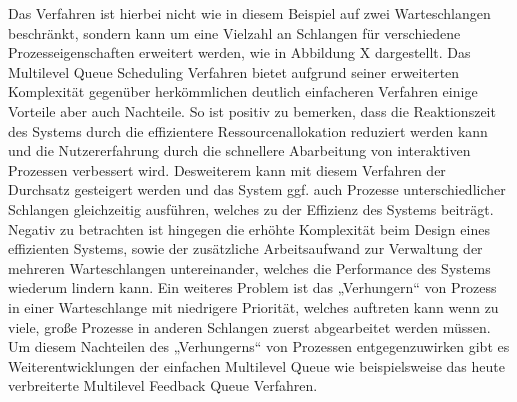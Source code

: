 Das Verfahren ist hierbei nicht wie in diesem Beispiel auf zwei Warteschlangen beschränkt, sondern kann um eine Vielzahl an Schlangen für verschiedene Prozesseigenschaften erweitert werden, wie in Abbildung X dargestellt.
Das Multilevel Queue Scheduling Verfahren bietet aufgrund seiner erweiterten Komplexität gegenüber herkömmlichen deutlich einfacheren Verfahren einige Vorteile aber auch Nachteile. So ist positiv zu bemerken, dass die Reaktionszeit des Systems durch die effizientere Ressourcenallokation reduziert werden kann und die Nutzererfahrung durch die schnellere Abarbeitung von interaktiven Prozessen verbessert wird. Desweiterem kann mit diesem Verfahren der Durchsatz gesteigert werden und das System ggf. auch Prozesse unterschiedlicher Schlangen gleichzeitig ausführen, welches zu der Effizienz des Systems beiträgt. Negativ zu betrachten ist hingegen die erhöhte Komplexität beim Design eines effizienten Systems, sowie der zusätzliche Arbeitsaufwand zur Verwaltung der mehreren Warteschlangen untereinander, welches die Performance des Systems wiederum lindern kann. Ein weiteres Problem ist das „Verhungern“ von Prozess in einer Warteschlange mit niedrigere Priorität, welches auftreten kann wenn zu viele, große Prozesse in anderen Schlangen zuerst abgearbeitet werden müssen.
Um diesem Nachteilen des „Verhungerns“ von Prozessen entgegenzuwirken gibt es Weiterentwicklungen der einfachen Multilevel Queue wie beispielsweise das heute verbreiterte Multilevel Feedback Queue Verfahren.

